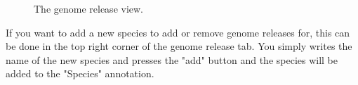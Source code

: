 \begin{figure}[h!]
\caption{The genome release view.}
\label{fig:adm_desktopGenomeTab}
\end{figure}

If you want to add a new species to add or remove genome releases for, this can be done in the top right corner of the genome release tab. You simply writes the name of the new species and presses the "add" button and the species will be added to the "Species" annotation.
